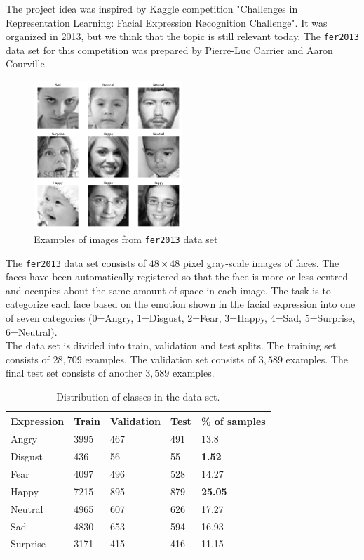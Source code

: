 The project idea was inspired by Kaggle competition "Challenges in Representation Learning: Facial Expression Recognition Challenge". It was organized in 2013, but we think that the topic is still relevant today. The \texttt{fer2013} data set \cite{dataset} for this competition was prepared by Pierre-Luc Carrier and Aaron Courville.\\

\begin{figure}
	\centering
	\includegraphics[width=0.5\textwidth]{../images/examples.png}
	\caption{Examples of images from \texttt{fer2013} data set}
	\label{fig:faces}
\end{figure}

The \texttt{fer2013} data set consists of $48\times48$ pixel gray-scale images of faces. The faces have been automatically registered so that the face is more or less centred and occupies about the same amount of space in each image. The task is to categorize each face based on the emotion shown in the facial expression into one of seven categories (0=Angry, 1=Disgust, 2=Fear, 3=Happy, 4=Sad, 5=Surprise, 6=Neutral).\\

The data set is divided into train, validation and test splits. The training set consists of $28,709$ examples. The validation set consists of $3,589$ examples. The final test set consists of another $3,589$ examples.\\

\begin{table}[H]
	\centering
	\begin{tabular}{ | l | l | l | l | l | }
		\hline
		Expression & Train & Validation & Test & \% of samples \\ \hline
		Angry & 3995 & 467 & 491 & 13.8 \\ %
		Disgust & 436 & 56 & 55 & \textbf{1.52} \\ %
		Fear & 4097 & 496 & 528 & 14.27 \\ %
		Happy & 7215 & 895 & 879 & \textbf{25.05} \\ %
		Neutral & 4965 & 607 & 626 & 17.27 \\ %
		Sad & 4830 & 653 & 594 & 16.93 \\ %
		Surprise & 3171 & 415 & 416 & 11.15 \\ 
		\hline
	\end{tabular}
	\caption{Distribution of classes in the data set.}
\end{table}

